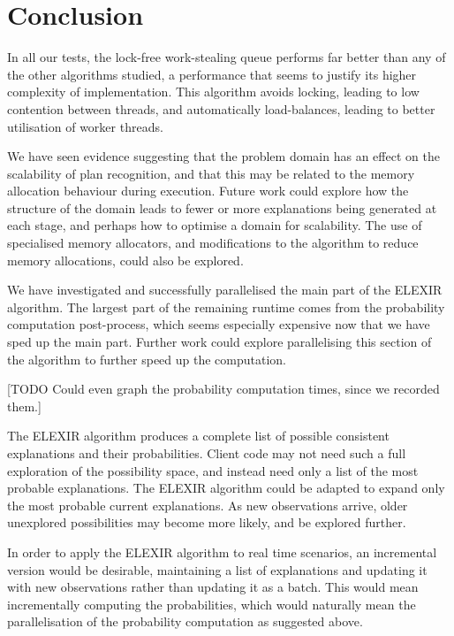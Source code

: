 \chapter{Conclusion}

In all our tests, the lock-free work-stealing queue performs far better than any of the other algorithms studied, a performance that seems to justify its higher complexity of implementation. This algorithm avoids locking, leading to low contention between threads, and automatically load-balances, leading to better utilisation of worker threads.

We have seen evidence suggesting that the problem domain has an effect on the scalability of plan recognition, and that this may be related to the memory allocation behaviour during execution. Future work could explore how the structure of the domain leads to fewer or more explanations being generated at each stage, and perhaps how to optimise a domain for scalability. The use of specialised memory allocators, and modifications to the algorithm to reduce memory allocations, could also be explored.

We have investigated and successfully parallelised the main part of the ELEXIR algorithm. The largest part of the remaining runtime comes from the probability computation post-process, which seems especially expensive now that we have sped up the main part. Further work could explore parallelising this section of the algorithm to further speed up the computation.

[TODO Could even graph the probability computation times, since we recorded them.]

The ELEXIR algorithm produces a complete list of possible consistent explanations and their probabilities. Client code may not need such a full exploration of the possibility space, and instead need only a list of the most probable explanations. The ELEXIR algorithm could be adapted to expand only the most probable current explanations. As new observations arrive, older unexplored possibilities may become more likely, and be explored further.

In order to apply the ELEXIR algorithm to real time scenarios, an incremental version would be desirable, maintaining a list of explanations and updating it with new observations rather than updating it as a batch. This would mean incrementally computing the probabilities, which would naturally mean the parallelisation of the probability computation as suggested above.
